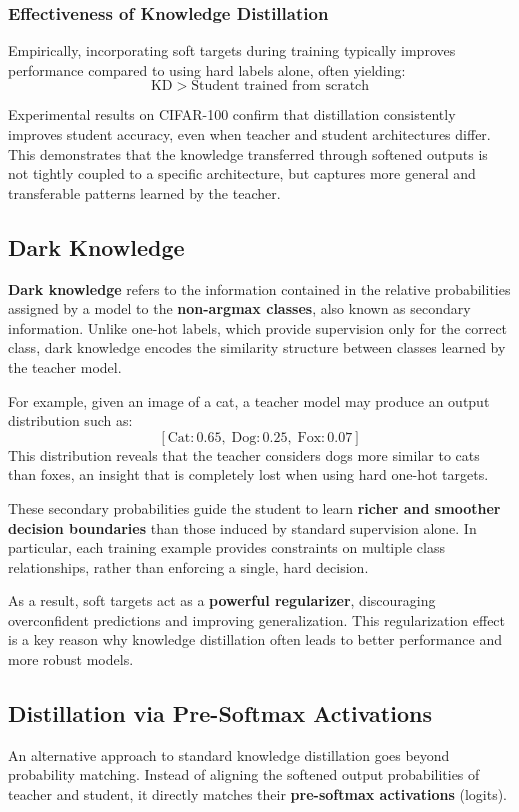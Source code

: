 \subsubsection{Effectiveness of Knowledge Distillation}
Empirically, incorporating soft targets during training typically improves performance compared
to using hard labels alone, often yielding:
\[
\text{KD} \; > \; \text{Student trained from scratch}
\]

Experimental results on CIFAR-100 confirm that distillation consistently improves student
accuracy, even when teacher and student architectures differ. This demonstrates that the
knowledge transferred through softened outputs is not tightly coupled to a specific
architecture, but captures more general and transferable patterns learned by the teacher.

\subsection{Dark Knowledge}
\textbf{Dark knowledge} refers to the information contained in the relative probabilities
assigned by a model to the \textbf{non-argmax classes}, also known as secondary information.
Unlike one-hot labels, which provide supervision only for the correct class, dark knowledge
encodes the similarity structure between classes learned by the teacher model.

For example, given an image of a cat, a teacher model may produce an output distribution such as:
\[
[\text{Cat}: 0.65,\; \text{Dog}: 0.25,\; \text{Fox}: 0.07]
\]
This distribution reveals that the teacher considers dogs more similar to cats than foxes, an
insight that is completely lost when using hard one-hot targets.

These secondary probabilities guide the student to learn \textbf{richer and smoother decision
boundaries} than those induced by standard supervision alone. In particular, each training
example provides constraints on multiple class relationships, rather than enforcing a single,
hard decision.

As a result, soft targets act as a \textbf{powerful regularizer}, discouraging overconfident
predictions and improving generalization. This regularization effect is a key reason why
knowledge distillation often leads to better performance and more robust models.

\subsection{Distillation via Pre-Softmax Activations}
An alternative approach to standard knowledge distillation goes beyond probability matching.
Instead of aligning the softened output probabilities of teacher and student, it directly
matches their \textbf{pre-softmax activations} (logits).


